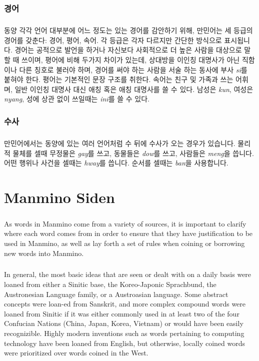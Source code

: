 \documentclass{book}
\begin{document}
        \vfill\newpage
        \subsection{경어}
        \paragraph{} 동양 각각 언어 대부분에 어느 정도는 있는 경어를 감안하기 위해, 만민어는 세 등급의 경어를 갖춘다: 경어, 평어, 속어.  각 등급은 각자 다르지만 간단한 방식으로 표시됩니다. 경어는 공적으로 발언을 하거나 자신보다 사회적으로 더 높은 사람을 대상으로 말할 때 쓰이며, 평어에 비해 두가지 차이가 있는데, 상대방을 이인칭 대명사가 아닌 직함이나 다른 칭호로 불러야 하며, 경어를 써야 하는 사람을 서술 하는 동사에 부사 \textit{si}를 붙혀야 한다. 평어는 기본적인 문장 구조를 취한다. 속어는 친구 및 가족과 쓰는 어휘며, 일반 이인칭 대명사 대신 애칭 혹은 애칭 대명사를 쓸 수 있다. 남성은 \textit{kun}, 여성은 \textit{nyang}, 성에 상관 없이 쓰일때는 \textit{ini}를 쓸 수 있다.
        \subsection{수사}
            \paragraph{} 만민어에서는 동양에 있는 여러 언어처럼 수 뒤에 수사가 오는 경우가 있습니다. 물리적 물체를 셀때 무정물은 \textit{gay}를 쓰고, 동물들은  \textit{dow}를 쓰고, 사람들은 \textit{meng}을 씁니다. 어떤 행위나 사건을 셀때는 \textit{hway}를 씁니다. 순서를 셀때는 \textit{ban}을 사용합니다.
        \vfill\newpage

\chapter{Manmino Siden}\normalsize
\paragraph{} 
As words in Manmino come from a variety of sources, it is important to clarify where each word comes from in order to ensure that they have justification to be used in Manmino, as well as lay forth a set of rules when coining or borrowing new words into Manmino.

\paragraph{}
In general, the most basic ideas that are seen or dealt with on a daily basis were loaned from either a Sinitic base, the Koreo-Japonic Sprachbund, the Austronesian Language family, or a Austroasian language. Some abstract concepts were loan-ed from Sanskrit, and more complex compound words were loaned from Sinitic if it was either commonly used in at least two of the four Confucian Nations (China, Japan, Korea, Vietnam) or would have been easily recognizible. Highly modern inventions such as words pertaining to computing technology have been loaned from English, but otherwise, locally coined words were prioritized over words coined in the West.
\end{document}
